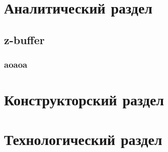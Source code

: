 \fontsize{14pt}{14pt}\selectfont

\Blindtext

\newpage
\section{Аналитический раздел}
\Blindtext

\subsection{z-buffer}
\Blindtext

\subsubsection{aoaoa}
\Blindtext

\newpage
\section{Конструкторский раздел}
\Blindtext

\newpage
\section{Технологический раздел}
\Blindtext

\newpage
{}
\Blindtext

\newpage
{}
\Blindtext

\newpage
{}
\Blindtext
